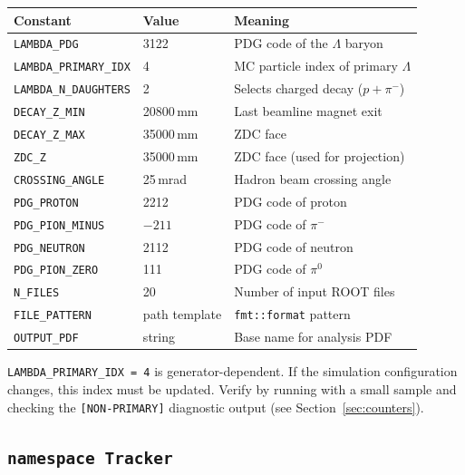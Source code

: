\documentclass[11pt]{article}
\begin{document}
\begin{center}
\renewcommand{\arraystretch}{1.3}
\begin{tabular}{lll}
\toprule
Constant & Value & Meaning \\
\midrule
\texttt{LAMBDA\_PDG} & 3122 & PDG code of the $\Lambda$ baryon \\
\texttt{LAMBDA\_PRIMARY\_IDX} & 4 & MC particle index of primary $\Lambda$ \\
\texttt{LAMBDA\_N\_DAUGHTERS} & 2 & Selects charged decay ($p + \pi^-$) \\
\texttt{DECAY\_Z\_MIN} & 20800\,mm & Last beamline magnet exit \\
\texttt{DECAY\_Z\_MAX} & 35000\,mm & ZDC face \\
\texttt{ZDC\_Z} & 35000\,mm & ZDC face (used for projection) \\
\texttt{CROSSING\_ANGLE} & 25\,mrad & Hadron beam crossing angle \\
\texttt{PDG\_PROTON} & 2212 & PDG code of proton \\
\texttt{PDG\_PION\_MINUS} & $-211$ & PDG code of $\pi^-$ \\
\texttt{PDG\_NEUTRON} & 2112 & PDG code of neutron \\
\texttt{PDG\_PION\_ZERO} & 111 & PDG code of $\pi^0$ \\
\texttt{N\_FILES} & 20 & Number of input ROOT files \\
\texttt{FILE\_PATTERN} & path template & \texttt{fmt::format} pattern \\
\texttt{OUTPUT\_PDF} & string & Base name for analysis PDF \\
\bottomrule
\end{tabular}
\end{center}

\begin{warnbox}
\texttt{LAMBDA\_PRIMARY\_IDX = 4} is generator-dependent. If the
simulation configuration changes, this index must be updated. Verify
by running with a small sample and checking the \texttt{[NON-PRIMARY]}
diagnostic output (see Section~\ref{sec:counters}).
\end{warnbox}

\subsection{\texttt{namespace Tracker}}
\end{document}
